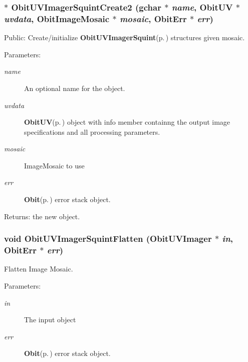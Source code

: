 \subsubsection{$\ast$ Obit\-UVImager\-Squint\-Create2 (gchar $\ast$ {\em name}, {\bf Obit\-UV} $\ast$ {\em uvdata}, {\bf Obit\-Image\-Mosaic} $\ast$ {\em mosaic}, {\bf Obit\-Err} $\ast$ {\em err})}\label{ObitUVImagerSquint_8c_a12}


Public: Create/initialize {\bf Obit\-UVImager\-Squint}{\rm (p.\,\pageref{structObitUVImagerSquint})} structures given mosaic. 

\begin{Desc}
\item[Parameters:]
\begin{description}
\item[{\em name}]An optional name for the object. \item[{\em uvdata}]{\bf Obit\-UV}{\rm (p.\,\pageref{structObitUV})} object with info member containng the output image specifications and all processing parameters. \item[{\em mosaic}]Image\-Mosaic to use \item[{\em err}]{\bf Obit}{\rm (p.\,\pageref{structObit})} error stack object. \end{description}
\end{Desc}
\begin{Desc}
\item[Returns:]the new object. \end{Desc}
\subsubsection{\setlength{\rightskip}{0pt plus 5cm}void Obit\-UVImager\-Squint\-Flatten ({\bf Obit\-UVImager} $\ast$ {\em in}, {\bf Obit\-Err} $\ast$ {\em err})}\label{ObitUVImagerSquint_8c_a14}


Flatten Image Mosaic. 

\begin{Desc}
\item[Parameters:]
\begin{description}
\item[{\em in}]The input object \item[{\em err}]{\bf Obit}{\rm (p.\,\pageref{structObit})} error stack object. \end{description}
\end{Desc}
